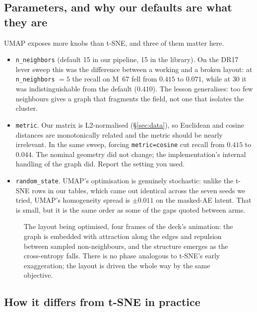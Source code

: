 \subsection{Parameters, and why our defaults are what they are}

UMAP exposes more knobs than t-SNE, and three of them matter here.

\begin{itemize}
\item \texttt{n\_neighbors} (default 15 in our pipeline, 15 in the library).
  On the DR17 lever sweep this was the difference between a working and a
  broken layout: at \texttt{n\_neighbors} $=5$ the recall on M~67 fell from
  $0.415$ to $0.071$, while at $30$ it was indistinguishable from the default
  ($0.410$). The lesson generalises: too few neighbours gives a graph that
  fragments the field, not one that isolates the cluster.
\item \texttt{metric}. Our matrix is L2-normalised (\S\ref{sec:data}), so
  Euclidean and cosine distances are monotonically related and the metric
  should be nearly irrelevant. In the same sweep, forcing
  \texttt{metric=cosine} cut recall from $0.415$ to $0.044$. The nominal
  geometry did not change; the implementation's internal handling of the graph
  did. Report the setting you used.
\item \texttt{random\_state}. UMAP's optimisation is genuinely stochastic:
unlike the t-SNE rows in our tables, which came out identical across the seven
seeds we tried, UMAP's homogeneity spread is $\pm0.011$ on the masked-AE
latent. That is small, but it is the same order as some of the gaps quoted
between arms.
\end{itemize}

\begin{figure}[htbp]\centering
  \caption{The layout being optimised, four frames of the deck's animation:
  the graph is embedded with attraction along the edges and repulsion between
  sampled non-neighbours, and the structure emerges as the cross-entropy
  falls. There is no phase analogous to t-SNE's early exaggeration; the layout
  is driven the whole way by the same objective.}
  \label{fig:umapfilm}
\end{figure}

\subsection{How it differs from t-SNE in practice}

